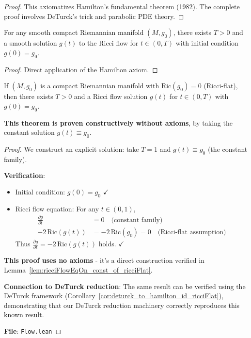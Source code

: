 \begin{proof}
This axiomatizes Hamilton's fundamental theorem (1982). The complete proof involves DeTurck's trick and parabolic PDE theory.
\end{proof}

\begin{theorem}
\label{thm:short_time_existence}
\leanok
{}
For any smooth compact Riemannian manifold $(M, g_0)$, there exists $T > 0$ and a smooth solution $g(t)$ to the Ricci flow for $t \in (0, T)$ with initial condition $g(0) = g_0$.
\end{theorem}

\begin{proof}
\leanok
{}
Direct application of the Hamilton axiom.
\end{proof}

\begin{theorem}
\label{thm:short_time_existence_ricciflat}
\leanok
{}
If $(M, g_0)$ is a compact Riemannian manifold with $\mathrm{Ric}(g_0) = 0$ (Ricci-flat), then there exists $T > 0$ and a Ricci flow solution $g(t)$ for $t \in (0, T)$ with $g(0) = g_0$.

\textbf{This theorem is proven constructively without axioms}, by taking the constant solution $g(t) \equiv g_0$.
\end{theorem}

\begin{proof}
\leanok
{}
We construct an explicit solution: take $T = 1$ and $g(t) \equiv g_0$ (the constant family).

\textbf{Verification}:
\begin{itemize}
\item Initial condition: $g(0) = g_0$ $\checkmark$
\item Ricci flow equation: For any $t \in (0, 1)$,
\begin{align*}
\frac{\partial g}{\partial t} &= 0 \quad \text{(constant family)} \\
-2 \, \mathrm{Ric}(g(t)) &= -2 \, \mathrm{Ric}(g_0) = 0 \quad \text{(Ricci-flat assumption)}
\end{align*}
Thus $\frac{\partial g}{\partial t} = -2 \, \mathrm{Ric}(g(t))$ holds. $\checkmark$
\end{itemize}

\textbf{This proof uses no axioms} - it's a direct construction verified in Lemma~\ref{lem:ricciFlowEqOn_const_of_ricciFlat}.

\textbf{Connection to DeTurck reduction}: The same result can be verified using the DeTurck framework (Corollary~\ref{cor:deturck_to_hamilton_id_ricciFlat}), demonstrating that our DeTurck reduction machinery correctly reproduces this known result.

\textbf{File}: \texttt{Flow.lean}
\end{proof}

